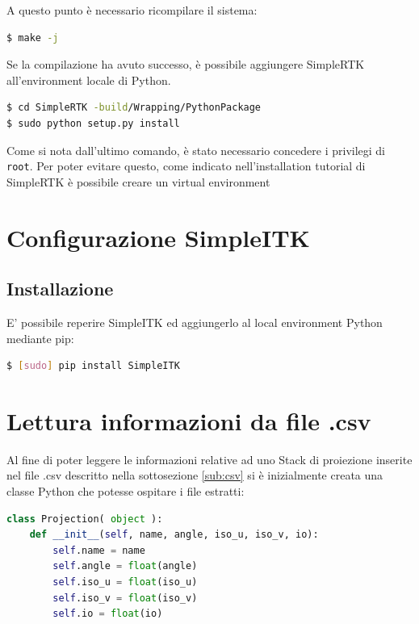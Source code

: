 \documentclass[a4paper,12pt, doubleside]{report}
\begin{document}
                    A questo punto è necessario ricompilare il sistema:
                    \begin{lstlisting}[language=bash, frame=bt]
$ make -j
                    \end{lstlisting}
                    
                    Se la compilazione ha avuto successo, è possibile aggiungere SimpleRTK all'environment locale di Python.
                    \begin{lstlisting}[language=bash, frame=bt]
$ cd SimpleRTK -build/Wrapping/PythonPackage
$ sudo python setup.py install
                    \end{lstlisting}
                    Come si nota dall'ultimo comando, è stato necessario concedere i privilegi di \texttt{root}. Per poter evitare questo, come indicato nell'installation tutorial di SimpleRTK è possibile creare un virtual environment\cite{simplertk-wiki}
               
        \section{Configurazione SimpleITK}
            \subsection{Installazione}
                E' possibile reperire SimpleITK ed aggiungerlo al local environment Python mediante pip:
                \begin{lstlisting}[language=bash, frame=bt]
$ [sudo] pip install SimpleITK
                    \end{lstlisting}
            
        
        \section{Lettura informazioni da file .csv}
            \label{sec:lettura-csv}
            Al fine di poter leggere le informazioni relative ad uno Stack di proiezione inserite nel file .csv descritto nella sottosezione \ref{sub:csv} si è inizialmente creata una classe Python che potesse ospitare i file estratti:
            
            \begin{lstlisting}[language=python, frame=bt]
class Projection( object ):
    def __init__(self, name, angle, iso_u, iso_v, io):
        self.name = name
        self.angle = float(angle)
        self.iso_u = float(iso_u)
        self.iso_v = float(iso_v)
        self.io = float(io)
            \end{lstlisting}
            
\end{document}
